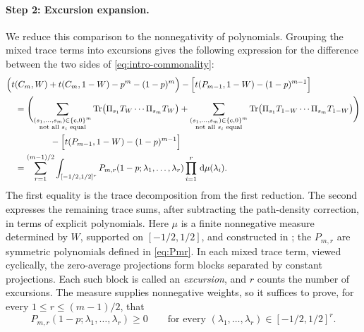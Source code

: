 \documentclass[11pt]{article}
\theoremstyle{remark}
\numberwithin{equation}{section}
\newcommand{\Tr}{\operatorname{Tr}}
\newcommand{\dd}{\,\mathrm d}
\newcommand{\tC}[2]{t(C_{#1},#2)}
\newcommand{\tP}[2]{t(P_{#1},#2)}
\newcommand{\Tker}[1]{T_{#1}}
\begin{document}
\paragraph{Step 2: Excursion expansion.}
We reduce this comparison to the nonnegativity of polynomials.
Grouping the mixed trace terms into excursions gives the following expression for the difference between the two sides of \eqref{eq:intro-commonality}:
\[
  \begin{aligned}
    & \Bigl(\tC mW+\tC m{1-W}-p^m-(1-p)^m\Bigr)
      - \Bigl[\tP{m-1}{1-W}-(1-p)^{m-1}\Bigr]\\
    &\quad {} =
      \Biggl(\sum_{\substack{(s_1,\ldots,s_m)\in\{\mathrm c,0\}^m\\
                            \text{not all }s_i\text{ equal}}}
      \Tr\bigl(\Pi_{s_1}\Tker W\cdots\Pi_{s_m}\Tker W\bigr)
      +\sum_{\substack{(s_1,\ldots,s_m)\in\{\mathrm c,0\}^m\\
                             \text{not all }s_i\text{ equal}}}
      \Tr\bigl(\Pi_{s_1}\Tker{1-W}\cdots\Pi_{s_m}\Tker{1-W}\bigr)\Biggr)\\
    &\quad\qquad\qquad {} - \Bigl[\tP{m-1}{1-W}-(1-p)^{m-1}\Bigr]\\
    &\quad {} =
      \sum_{r=1}^{(m-1)/2}
      \int_{[-1/2,1/2]^r}
      P_{m,r}(1-p;\lambda_1,\ldots,\lambda_r)
      \prod_{i=1}^r\dd\mu(\lambda_i).
  \end{aligned}
\]
The first equality is the trace decomposition from the first reduction.
The second expresses the remaining trace sums, after subtracting the path-density correction, in terms of explicit polynomials.
Here $\mu$ is a finite nonnegative measure determined by $W$, supported on $[-1/2,1/2]$, and constructed in ; the $P_{m,r}$ are symmetric polynomials defined in \eqref{eq:Pmr}.
In each mixed trace term, viewed cyclically, the zero-average projections form blocks separated by constant projections.
Each such block is called an \emph{excursion}, and $r$ counts the number of excursions.
The measure supplies nonnegative weights, so it suffices to prove, for every $1\le r\le(m-1)/2$, that
\begin{equation}\label{eq:intro-polynomial-positive}
  P_{m,r}(1-p;\lambda_1,\ldots,\lambda_r)\ge0
  \qquad\text{for every }(\lambda_1,\ldots,\lambda_r)\in[-1/2,1/2]^r.
\end{equation}
\end{document}
